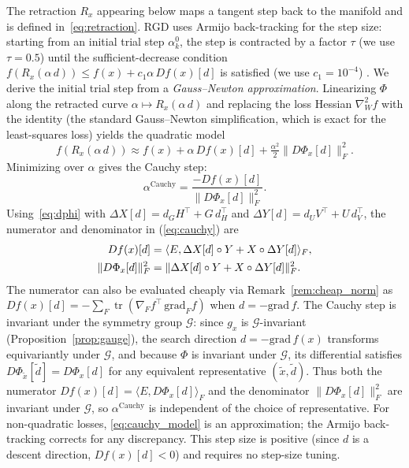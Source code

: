 \documentclass[letterpaper, 10 pt, conference]{ieeeconf}
\newcommand{\cG}{\mathcal{G}}
\newcommand{\tr}{\operatorname{tr}}
\newcommand{\Had}{\circ}
\newcommand{\ip}[2]{\langle #1, #2 \rangle}
\theoremstyle{plain}
\theoremstyle{definition}
\theoremstyle{remark}
\begin{document}
The retraction $R_x$ appearing below maps a tangent step back to the manifold and is defined in~\eqref{eq:retraction}.
RGD uses Armijo back-tracking for the step size: starting from an initial trial step $\alpha_k^0$, the step is contracted by a factor $\tau$ (we use $\tau{=}0.5$) until the sufficient-decrease condition $f(R_x(\alpha\,d)) \leq f(x) + c_1\alpha\,Df(x)[d]$ is satisfied (we use $c_1{=}10^{-4}$) \cite{absilbook,boumal2023introduction}.
We derive the initial trial step from a \emph{Gauss--Newton approximation}.
Linearizing $\Phi$ along the retracted curve $\alpha \mapsto R_x(\alpha\,d)$ and replacing the loss Hessian $\nabla^2_W f$ with the identity (the standard Gauss--Newton simplification, which is exact for the least-squares loss) yields the quadratic model
\begin{equation}
  f(R_x(\alpha\,d)) \approx f(x) + \alpha\,Df(x)[d] + \tfrac{\alpha^2}{2}\|D\Phi_x[d]\|_F^2.
  \label{eq:cauchy_model}
\end{equation}
Minimizing over $\alpha$ gives the Cauchy step:
\begin{equation}
  \alpha^{\mathrm{Cauchy}} = \frac{-Df(x)[d]}{\|D\Phi_x[d]\|_F^2}.
  \label{eq:cauchy}
\end{equation}
Using~\eqref{eq:dphi} with $\Delta X[d] = d_G H^\top + G\,d_H^\top$ and $\Delta Y[d] = d_U V^\top + U\,d_V^\top$, the numerator and denominator in (\ref{eq:cauchy}) are
\begin{align}
  Df(x)[d] &= \ip{E}{\Delta X[d]\Had Y + X\Had\Delta Y[d]}_F, \notag\\
  \|D\Phi_x[d]\|_F^2 &= \|\Delta X[d]\Had Y + X\Had\Delta Y[d]\|_F^2. \notag
\end{align}
The numerator can also be evaluated cheaply via Remark~\ref{rem:cheap_norm} as $Df(x)[d] = -\sum_F \tr(\nabla_F f^\top\,\mathrm{grad}_F f)$ when $d = -\mathrm{grad}\,f$.
The Cauchy step is invariant under the symmetry group $\cG$: since $g_x$ is $\cG$-invariant (Proposition~\ref{prop:gauge}), the search direction $d = -\mathrm{grad}\,f(x)$ transforms equivariantly under $\cG$, and because $\Phi$ is invariant under $\cG$, its differential satisfies $D\Phi_{\tilde x}[\tilde d] = D\Phi_x[d]$ for any equivalent representative $(\tilde x, \tilde d)$.
Thus both the numerator $Df(x)[d] = \ip{E}{D\Phi_x[d]}_F$ and the denominator $\|D\Phi_x[d]\|_F^2$ are invariant under $\cG$, so $\alpha^{\mathrm{Cauchy}}$ is independent of the choice of representative.
For non-quadratic losses, \eqref{eq:cauchy_model} is an approximation; the Armijo back-tracking corrects for any discrepancy.
This step size is positive (since $d$ is a descent direction, $Df(x)[d] < 0$) and requires no step-size tuning.
\end{document}
